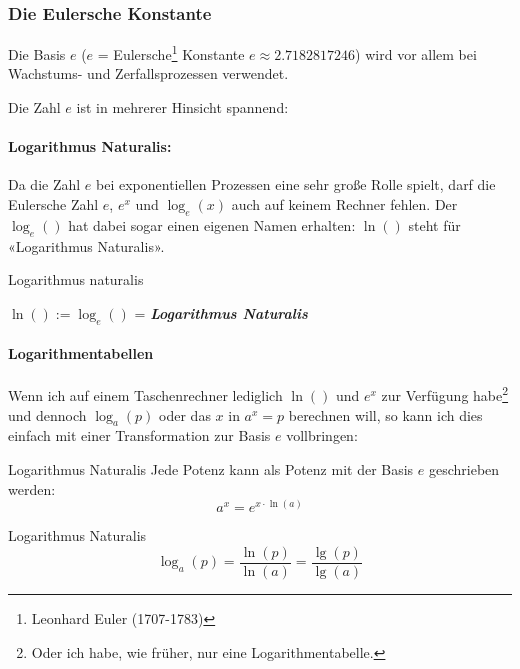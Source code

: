 \newpage


\subsubsection{Die Eulersche Konstante}

Die Basis $e$ ($e$ = Eulersche\footnote{Leonhard Euler (1707-1783)} Konstante $e\approx 2.7182817246$) wird vor allem bei Wachstums- und Zerfallsprozessen verwendet.

Die Zahl $e$ ist in mehrerer Hinsicht spannend:

\paragraph{Logarithmus Naturalis:} Da die
Zahl $e$ bei exponentiellen Prozessen eine sehr große Rolle spielt,
darf die Eulersche Zahl $e$, $e^x$ und $\log_e(x)$ auch auf keinem Rechner fehlen. Der $\log_e()$ hat dabei sogar einen eigenen Namen erhalten:
$\ln()$ steht für «Logarithmus Naturalis».

\begin{definition}{Logarithmus naturalis}{}
  
  $\ln() := \log_e()$ = \textit{\textbf{Logarithmus Naturalis}}
\end{definition}

\paragraph{Logarithmentabellen}
Wenn ich auf einem Taschenrechner lediglich $\ln()$ und $e^x$ zur
Verfügung habe\footnote{Oder ich habe, wie früher, nur eine
Logarithmentabelle.} und dennoch $\log_a(p)$ oder das $x$ in $a^x=p$ berechnen will, so kann ich dies einfach mit einer Transformation zur Basis $e$ vollbringen:

\begin{bemerkung}{Logarithmus Naturalis}{}
  Jede Potenz kann als Potenz mit der Basis $e$ geschrieben werden:
  $$a^x = e^{x\cdot{}\ln(a)}$$
\end{bemerkung}

\begin{gesetz}{Logarithmus Naturalis}{}
$$\log_a(p) = \frac{\ln(p)}{\ln(a)} = \frac{\lg(p)}{\lg(a)}$$
\end{gesetz}

\newpage




